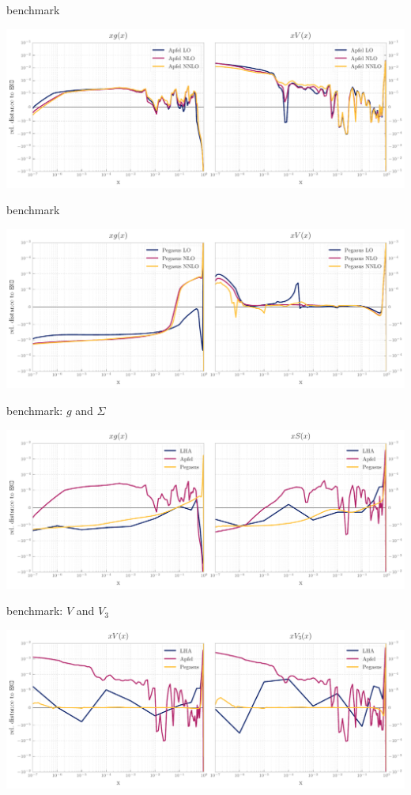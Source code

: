 \documentclass[9pt]{beamer}
\begin{document}
\begin{frame}{\eko{} \apfel{} benchmark}
	\begin{center}
		\includegraphics[width=\linewidth]{Apfel_bench_pto.pdf}
	\end{center}
\end{frame}
\begin{frame}{\eko{} \pegasus{} benchmark}
	\begin{center}
		\includegraphics[width=\linewidth]{Pegasus_bench_pto.pdf}
	\end{center}
\end{frame}
\begin{frame}{\eko{} \lha{} benchmark: $g$ and $\Sigma$}
	\begin{center}
		\includegraphics[width=\linewidth]{lha_bench_g_S.pdf}
	\end{center}
\end{frame}
\begin{frame}{\eko{} \lha{} benchmark: $V$ and $V_3$}
	\begin{center}
		\includegraphics[width=\linewidth]{lha_bench_V_V3.pdf}
	\end{center}
\end{frame}
\end{document}
